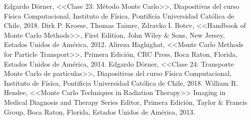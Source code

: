 
\begin{thebibliography}{0}
 Edgardo Dörner, <<Clase 23: Método Monte Carlo>>, Diapositivas del curso Física Computacional, Instituto de Física, Pontificia Universidad Católica de Chile, 2018.
 Dirk P. Kroese, Thomas Taimre, Zdravko I. Botev, <<Handbook of Monte Carlo Methods>>, First Edition, John Wiley $\&$ Sons, New Jersey, Estados Unidos de América, 2012.
 Alireza Haghighat, <<Monte Carlo Methods for Particle Transport>>, Primera Edición, CRC Press, Boca Raton, Florida, Estados Unidos de América, 2014.
 Edgardo Dörner, <<Clase 24: Transporte Monte Carlo de partículas>>, Diapositivas del curso Física Computacional, Instituto de Física, Pontificia Universidad Católica de Chile, 2018.
 William R. Hendee, <<Monte Carlo Techniques in Radiation Therapy>> Imaging in Medical Diagnosis and Therapy Series Editor, Primera Edición, Taylor $\&$ Francis Group, Boca Raton, Florida, Estados Unidos de América, 2013. 
\end{thebibliography}
